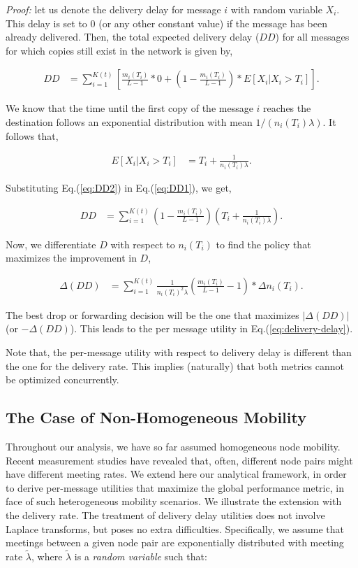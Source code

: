 \emph{Proof:} let us denote the delivery delay for message $i$ with random variable $X_i$. This delay is set to $0$ (or any other constant value) if the message has been already delivered. Then, the total expected delivery delay ($DD$) for all messages for which copies still exist in the network is given by,

\small
\begin{align}\label{eq:DD1}
DD & = \sum_{i=1}^{K(t)} \left[\frac{m_i(T_i)}{L-1}*0 + (1 - \frac{m_i(T_i)}{L-1}) * E[X_i | X_i
> T_i]\right].
\end{align}
\normalsize

We know that the time until the first copy of the message $i$ reaches the destination follows an exponential distribution with mean $1/(n_i(T_i)\lambda)$. It follows that,

\begin{align}\label{eq:DD2}
E[X_i | X_i
> T_i] &= T_i + \frac{1}{n_i(T_i) \lambda}.
\end{align}

Substituting Eq.(\ref{eq:DD2}) in Eq.(\ref{eq:DD1}), we get,

\begin{align*}
DD &= \sum_{i=1}^{K(t)} (1 - \frac{m_i(T_i)}{L-1})(T_i + \frac{1}{n_i(T_i)
\lambda}).
\end{align*}

Now, we differentiate $D$ with respect to $n_i(T_i)$ to find the policy that maximizes the improvement in $D$,

\begin{align*}
\Delta(DD) &= \sum_{i=1}^{K(t)}{\frac{1}{n_i(T_i)^2 \lambda} ( \frac{m_i(T_i)}{L-1}-1)* \Delta n_i(T_i)}.
\end{align*}

The best drop or forwarding decision will be the one that maximizes $\vert\Delta(DD)\vert$ (or $-\Delta(DD)$). This leads to the per message utility in Eq.(\ref{eq:delivery-delay}).

Note that, the per-message utility with respect to delivery delay is different than the one for the delivery rate. This implies (naturally) that both metrics cannot be optimized concurrently.

\subsection{The Case of Non-Homogeneous Mobility}
\label{section:heterogeneous-mobility}

Throughout our analysis, we have so far assumed homogeneous node mobility. Recent measurement studies have revealed that, often, different node pairs might have different meeting rates. We extend here our analytical framework, in order to derive per-message utilities that maximize the global performance metric, in face of such heterogeneous mobility scenarios. We illustrate the extension with the delivery rate. The treatment of delivery delay utilities does not involve Laplace transforms, but poses no extra difficulties. Specifically, we assume that meetings between a given node pair are exponentially distributed with meeting rate $\tilde{\lambda}$, where $\tilde{\lambda}$ is a \emph{random variable} such that:

